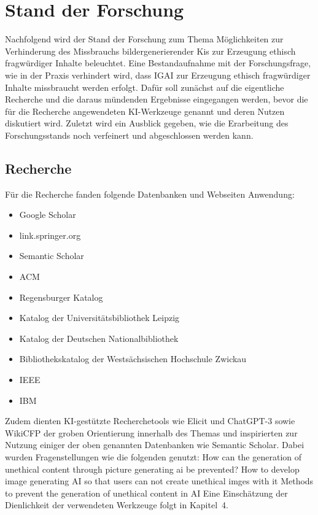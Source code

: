 \section{Stand der Forschung}
Nachfolgend wird der Stand der Forschung zum Thema Möglichkeiten zur Verhinderung 
des Missbrauchs bildergenerierender Kis zur Erzeugung ethisch fragwürdiger Inhalte beleuchtet. Eine Bestandaufnahme 
mit der Forschungsfrage, wie in der Praxis verhindert wird, dass IGAI zur Erzeugung ethisch fragwürdiger 
Inhalte missbraucht werden erfolgt. Dafür soll zunächst auf die eigentliche Recherche und die daraus mündenden 
Ergebnisse eingegangen werden, bevor die für die Recherche angewendeten KI-Werkzeuge genannt und deren 
Nutzen diskutiert wird. Zuletzt wird ein Ausblick gegeben, wie die Erarbeitung des Forschungsstands noch 
verfeinert und abgeschlossen werden kann.
\subsection{Recherche}
Für die Recherche fanden folgende Datenbanken und Webseiten Anwendung:
\begin{itemize}
    \item Google Scholar
    \item link.springer.org
    \item Semantic Scholar
    \item ACM
    \item Regensburger Katalog
    \item Katalog der Universitätsbibliothek Leipzig
    \item Katalog der Deutschen Nationalbibliothek
    \item Bibliothekskatalog der Westsächsischen Hochschule Zwickau
    \item IEEE
    \item IBM    
\end{itemize}

Zudem dienten KI-gestützte Recherchetools wie Elicit und ChatGPT-3 sowie WikiCFP der groben 
Orientierung innerhalb des Themas und inspirierten zur Nutzung einiger der oben genannten 
Datenbanken wie Semantic Scholar. Dabei wurden Fragenstellungen wie die folgenden genutzt:
How can the generation of unethical content through picture generating ai be prevented?
How to develop image generating AI so that users can not create unethical imges with it
Methods to prevent the generation of unethical content in AI
Eine Einschätzung der Dienlichkeit der verwendeten Werkzeuge folgt in Kapitel 4.

